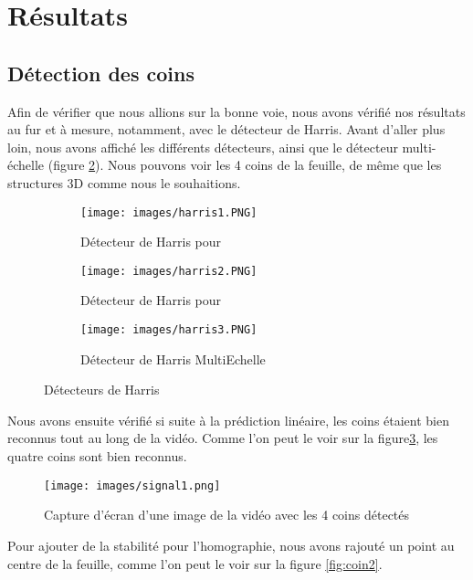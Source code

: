 \documentclass[blue]{ceri/sty/rapport}
\begin{document}
\section{Résultats}
\label{sec:Generalites3}

\subsection{Détection des coins}

Afin de vérifier que nous allions sur la bonne voie, nous avons vérifié nos résultats au fur et à mesure, notamment, avec le détecteur de Harris. Avant d'aller plus loin, nous avons affiché les différents détecteurs, ainsi que le détecteur multi-échelle (figure \ref{fig:subfigures2}). Nous pouvons voir les 4 coins de la feuille, de même que les structures 3D comme nous le souhaitions.

\begin{figure}[H]
\centering
\begin{subfigure}[t]{0.3\textwidth}
\texttt{[image: images/harris1.PNG]}
\caption{Détecteur de Harris pour }
\label{fig:subfig2}
\end{subfigure}
\hfill
\begin{subfigure}[t]{0.3\textwidth}
\texttt{[image: images/harris2.PNG]}
\caption{Détecteur de Harris pour }
\end{subfigure}
\hfill
\begin{subfigure}[t]{0.3\textwidth}
\texttt{[image: images/harris3.PNG]}
\caption{Détecteur de Harris MultiEchelle}
\end{subfigure}
\caption{Détecteurs de Harris}
\label{fig:subfigures2}
\end{figure}



Nous avons ensuite vérifié si suite à la prédiction linéaire, les coins étaient bien reconnus tout au long de la vidéo. Comme l'on peut le voir sur la figure\ref{fig:coin1}, les quatre coins sont bien reconnus. 


\begin{figure}[H]
\centering
\texttt{[image: images/signal1.png]}
\caption[coin1]{Capture d'écran d'une image de la vidéo avec les 4 coins détectés}
\label{fig:coin1}
\end{figure}


Pour ajouter de la stabilité pour l'homographie, nous avons rajouté un point au centre de la feuille, comme l'on peut le voir sur la figure \ref{fig:coin2}.
\end{document}
